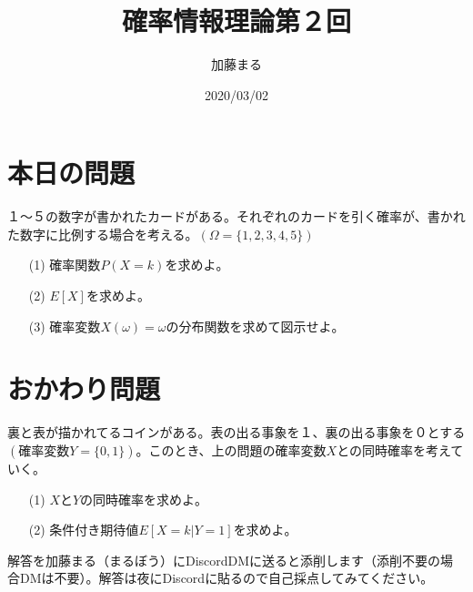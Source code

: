 \documentclass[a4j,uplatex]{jsarticle}
\title{確率情報理論第２回}
\author{加藤まる}
\date{2020/03/02}
\begin{document}
\maketitle

\section*{本日の問題}
１〜５の数字が書かれたカードがある。それぞれのカードを引く確率が、書かれた数字に比例する場合を考える。$(\Omega=\{ 1,2,3,4,5\})$
\begin{itemize}
  \item[(1)] 確率関数$P(X=k)$を求めよ。
  \item[(2)] $E[X]$を求めよ。
  \item[(3)] 確率変数$X(\omega)=\omega$の分布関数を求めて図示せよ。
\end{itemize}

\section*{おかわり問題}
裏と表が描かれてるコインがある。表の出る事象を１、裏の出る事象を０とする$(確率変数Y=\{ 0,1\})$。このとき、上の問題の確率変数$X$との同時確率を考えていく。
\begin{itemize}
  \item[(1)] $X$と$Y$の同時確率を求めよ。
  \item[(2)] 条件付き期待値$E[X=k|Y=1]$を求めよ。
\end{itemize}

解答を加藤まる（まるぼう）にDiscordDMに送ると添削します（添削不要の場合DMは不要）。解答は夜にDiscordに貼るので自己採点してみてください。
\end{document}
